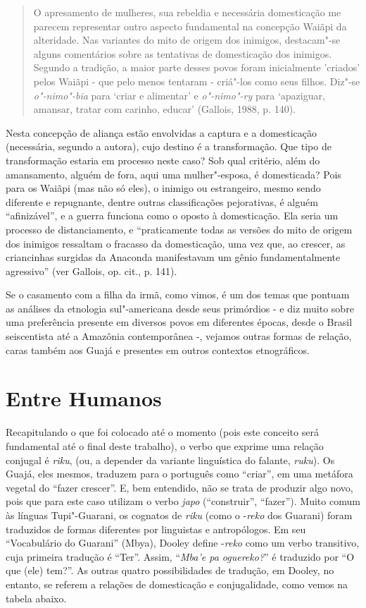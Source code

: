 \begin{quote}
O apresamento de mulheres, sua rebeldia e necessária domesticação me
parecem representar outro aspecto fundamental na concepção Waiãpi da
alteridade. Nas variantes do mito de origem dos inimigos, destacam"-se
alguns comentários sobre as tentativas de domesticação dos inimigos.
Segundo a tradição, a maior parte desses povos foram inicialmente
'criados' pelos Waiãpi - que pelo menos tentaram - criá"-los como seus
filhos. Diz"-se \emph{o"-nimo"-bia} para `criar e alimentar' e
\emph{o"-nimo"-ry} para `apaziguar, amansar, tratar com carinho, educar'
(Gallois, 1988, p. 140).
\end{quote}

Nesta concepção de aliança estão envolvidas a captura e a domesticação
(necessária, segundo a autora), cujo destino é a transformação. Que tipo
de transformação estaria em processo neste caso? Sob qual critério, além
do amansamento, alguém de fora, aqui uma mulher"-esposa, é domesticada?
Pois para os Waiãpi (mas não só eles), o inimigo ou estrangeiro, mesmo
sendo diferente e repugnante, dentre outras classificações pejorativas,
é alguém ``afinizável'', e a guerra funciona como o oposto à domesticação.
Ela seria um processo de distanciamento, e ``praticamente todas as
versões do mito de origem dos inimigos ressaltam o fracasso da
domesticação, uma vez que, ao crescer, as criancinhas surgidas da
Anaconda manifestavam um gênio fundamentalmente agressivo'' (ver
Gallois, op. cit., p. 141).

Se o casamento com a filha da irmã, como vimos, é um dos temas que
pontuam as análises da etnologia sul"-americana desde seus primórdios - e
diz muito sobre uma preferência presente em diversos povos em diferentes
épocas, desde o Brasil seiscentista até a Amazônia contemporânea -,
vejamos outras formas de relação, caras também aos Guajá e presentes em
outros contextos etnográficos.

\section{Entre Humanos}\label{entre-humanos}

Recapitulando o que foi colocado até o momento (pois este conceito será
fundamental até o final deste trabalho), o verbo que exprime uma relação
conjugal é \emph{riku}, (ou, a depender da variante linguística do
falante, \emph{ruku}). Os Guajá, eles mesmos, traduzem para o português
como ``criar'', em uma metáfora vegetal do ``fazer crescer''. E, bem
entendido, não se trata de produzir algo novo, pois que para este caso
utilizam o verbo \emph{japo} (``construir'', ``fazer''). Muito comum às
línguas Tupi"-Guarani, os cognatos de \emph{riku} (como o -\emph{reko}
dos Guarani) foram traduzidos de formas diferentes por linguistas e
antropólogos. Em seu ``Vocabulário do Guarani'' (Mbya), Dooley define
-\emph{reko} como um verbo transitivo, cuja primeira tradução é ``Ter''.
Assim, ``\emph{Mba'e pa oguereko?}'' é traduzido por ``O que (ele) tem?''.
As outras quatro possibilidades de tradução, em Dooley, no entanto, se
referem a relações de domesticação e conjugalidade, como vemos na tabela
abaixo.

